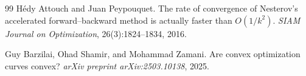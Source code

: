 \documentclass[11pt]{article}
\theoremstyle{plain}
\theoremstyle{remark}
\begin{document}
\begin{thebibliography}{99}
H{\'e}dy Attouch and Juan Peypouquet.
\newblock The rate of convergence of Nesterov’s accelerated forward--backward
  method is actually faster than $O(1/k^2)$.
\newblock \emph{SIAM Journal on Optimization}, 26(3):1824--1834, 2016.

Guy Barzilai, Ohad Shamir, and Mohammad Zamani.
\newblock Are convex optimization curves convex?
\newblock \emph{arXiv preprint arXiv:2503.10138}, 2025.

\end{thebibliography}
\end{document}
